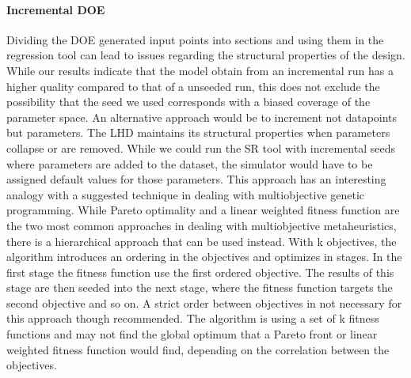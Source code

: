 \paragraph{Incremental DOE}
Dividing the DOE generated input points into sections and using them in the regression tool can lead to issues regarding the structural properties of the design. While our results indicate that the model obtain from an incremental run has a higher quality compared to that  of a unseeded run, this does not exclude the possibility that the seed we used corresponds with a biased coverage of the parameter space. An alternative approach would be to increment not datapoints but parameters. The LHD maintains its structural properties when parameters collapse or are removed. While we could run the SR tool with incremental seeds where parameters are added to the dataset, the simulator would have to be assigned default values for those parameters. This approach has an interesting analogy with a suggested technique in dealing with multiobjective genetic programming. While Pareto optimality and a linear weighted fitness function are the two most common approaches in dealing with multiobjective metaheuristics, there is a hierarchical approach that can be used instead. With k objectives, the algorithm introduces an ordering in the objectives and optimizes in stages. In the first stage the fitness function use the first ordered objective. The results of this stage are then seeded into the next stage, where the fitness function targets the second objective and so on. A strict order between objectives in not necessary for this approach though recommended. The algorithm is using a set of k fitness functions and may not find the global optimum that a Pareto front or linear weighted fitness function would find, depending on the correlation between the objectives.
